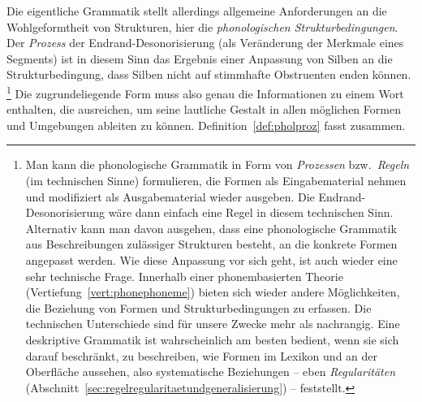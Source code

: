 Die eigentliche Grammatik stellt allerdings allgemeine Anforderungen an die Wohlgeformtheit von Strukturen, hier die \textit{phonologischen Strukturbedingungen}.
Der \textit{Prozess} der Endrand-Desonorisierung (als Veränderung der Merkmale eines Segments) ist in diesem Sinn das Ergebnis einer Anpassung von Silben an die Strukturbedingung, dass Silben nicht auf stimmhafte Obstruenten enden können.%
\footnote{Man kann die phonologische Grammatik in Form von \textit{Prozessen} bzw.\ \textit{Regeln} (im technischen Sinne) formulieren, die Formen als Eingabematerial nehmen und modifiziert als Ausgabematerial wieder ausgeben.
Die Endrand-Desonorisierung wäre dann einfach eine Regel in diesem technischen Sinn.
Alternativ kann man davon ausgehen, dass eine phonologische Grammatik aus Beschreibungen zulässiger Strukturen besteht, an die konkrete Formen angepasst werden.
Wie diese Anpassung vor sich geht, ist auch wieder eine sehr technische Frage.
Innerhalb einer phonembasierten Theorie (Vertiefung~\ref{vert:phonephoneme}) bieten sich wieder andere Möglichkeiten, die Beziehung von Formen und Strukturbedingungen zu erfassen.
Die technischen Unterschiede sind für unsere Zwecke mehr als nachrangig.
Eine deskriptive Grammatik ist wahrscheinlich am besten bedient, wenn sie sich darauf beschränkt, zu beschreiben, wie Formen im Lexikon und an der Oberfläche aussehen, also systematische Beziehungen -- eben \textit{Regularitäten} (Abschnitt~\ref{sec:regelregularitaetundgeneralisierung}) -- feststellt.}
Die zugrundeliegende Form muss also genau die Informationen zu einem Wort enthalten, die ausreichen, um seine lautliche Gestalt in allen möglichen Formen und Umgebungen ableiten zu können.
Definition~\ref{def:pholproz} fasst zusammen.


